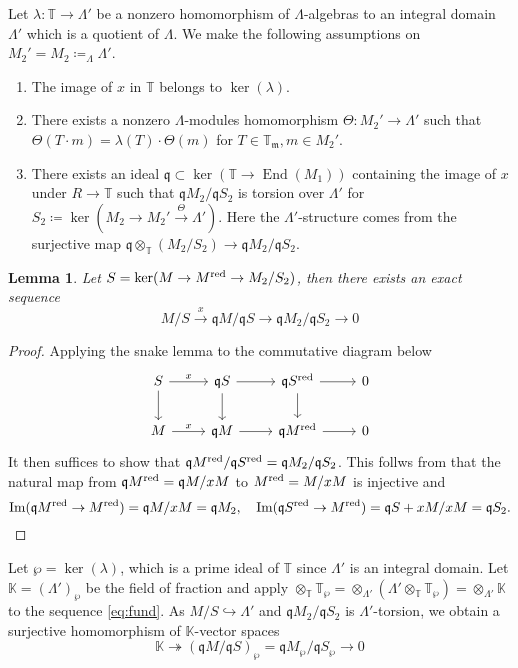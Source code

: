 \documentclass[leqno]{amsart}
\newtheorem{lem}[thm]{Lemma}
\theoremstyle{definition}
\theoremstyle{remark}
\DeclareMathOperator{\End}{End}
\DeclareMathOperator{\Image}{Im}
\newcommand{\fm}{\mathfrak{m}}
\newcommand{\fq}{\mathfrak{q}}
\newcommand{\red}{\textnormal{red}}
\newcommand{\TT}{\mathbb{T}} %
\begin{document}
Let $\lambda\colon \TT\to \Lambda'$
be a nonzero homomorphism of $\Lambda$-algebras
to an integral domain $\Lambda'$
which is a quotient of  $\Lambda$.
We make the following assumptions
on $M_2'=M_2\coloneqq_{\Lambda}\Lambda'$.
\begin{enumerate}[label=(C\roman*)]
\item The image of $x$ in  $\TT$ belongs to  $\ker(\lambda)$.
	\label{cond:C1}
\item There exists a nonzero 
$\Lambda$-modules homomorphism
$\Theta\colon M_2'\to \Lambda'$  such that 
$\Theta(T\cdot m)=\lambda(T)\cdot \Theta(m)$
for $T\in \TT_{\fm}, m\in M_2'$.
	\label{cond:C2}
\item There exists an ideal 
$\fq\subset \ker(\TT\to \End(M_1))$
containing the image of $x$ under $R\to \TT$
such that $\fq M_2/\fq S_2$
is torsion over $\Lambda'$ for 
$S_2\coloneqq\ker(M_2\to M_2'\xrightarrow{\Theta}\Lambda')$.
Here the $\Lambda'$-structure comes from the surjective
map  $\fq\otimes_{\TT}(M_2/S_2)\to \fq M_2/\fq S_2$.
	\label{cond:C3}

\end{enumerate}

\begin{lem}
Let $S=\ker(M\to M^{\red}\to M_2/S_2)$,
then there exists an exact sequence
\begin{equation}\label{eq:fund}
	M/S\xrightarrow{x} \fq M/\fq S\to 
	\fq M_2/\fq S_2 \to 0
\end{equation}
\end{lem}
\begin{proof}

Applying the snake lemma to 
the commutative diagram below
\[
\begin{tikzcd}
	S\arrow[r,"x"] \arrow[d]
	& \fq S \arrow[r] \arrow[d]
	& \fq S^{\red} \arrow[r] \arrow[d] & 0\\
	M\arrow[r,"x"]
	& \fq M \arrow[r]
	& \fq M^{\red} \arrow[r] & 0
\end{tikzcd}
\]
It then suffices to show that 
$\fq M^{\red}/\fq S^{\red}=\fq M_2/\fq S_2$.
This follws from that the natural map from
$\fq M^{\red}=\fq M/xM$ to $M^{\red}=M/xM$
is injective and
\[
	\Image(\fq M^{\red}\to M^{\red})=\fq M/xM=\fq M_2,\quad
	\Image(\fq S^{\red}\to M^{\red})=\fq S+xM/xM=\fq S_2.
\]

\end{proof}

Let $\wp=\ker(\lambda)$,
which is a prime ideal of $\TT$
since $\Lambda'$ is an integral domain.
Let $\mathbb{K}=(\Lambda')_{\wp}$ 
be the field of fraction
and apply 
$\otimes_{\TT}\TT_{\wp}=
\otimes_{\Lambda'}(\Lambda'\otimes_{\TT}\TT_\wp)=
\otimes_{\Lambda'}\mathbb{K}$ 
to the sequence \eqref{eq:fund}.
As $M/S\hookrightarrow \Lambda'$
and $\fq M_2/\fq S_2$ is $\Lambda'$-torsion, 
we obtain a surjective homomorphism 
of $\mathbb{K}$-vector spaces
\begin{equation}\label{eq:fund_frac}
	\mathbb{K}\twoheadrightarrow (\fq M/\fq S)_{\wp}
	= \fq M_\wp/\fq S_\wp\to 0
\end{equation}
\end{document}
